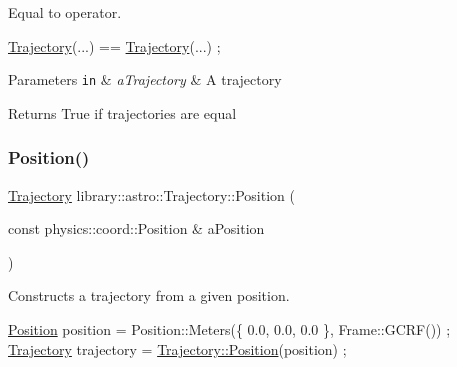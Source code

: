 Equal to operator. 


\begin{DoxyCode}
\hyperlink{classlibrary_1_1astro_1_1_trajectory_a8e5c7740915ca947e067c0f419ac1c65}{Trajectory}(...) == \hyperlink{classlibrary_1_1astro_1_1_trajectory_a8e5c7740915ca947e067c0f419ac1c65}{Trajectory}(...) ;
\end{DoxyCode}



\begin{DoxyParams}[1]{Parameters}
\mbox{\tt in}  & {\em a\+Trajectory} & A trajectory \\
\hline
\end{DoxyParams}
\begin{DoxyReturn}{Returns}
True if trajectories are equal 
\end{DoxyReturn}
\mbox{\label{classlibrary_1_1astro_1_1_trajectory_a39e9a50f84016cb53ca36d61809dc058}} 
\subsubsection{\texorpdfstring{Position()}{Position()}}
{\footnotesize\ttfamily \hyperlink{classlibrary_1_1astro_1_1_trajectory}{Trajectory} library\+::astro\+::\+Trajectory\+::\+Position (\begin{DoxyParamCaption}\item[{const physics\+::coord\+::\+Position \&}]{a\+Position }\end{DoxyParamCaption})\hspace{0.3cm}{\ttfamily [static]}}



Constructs a trajectory from a given position. 


\begin{DoxyCode}
\hyperlink{classlibrary_1_1astro_1_1_trajectory_a39e9a50f84016cb53ca36d61809dc058}{Position} position = Position::Meters(\{ 0.0, 0.0, 0.0 \}, Frame::GCRF()) ;
\hyperlink{classlibrary_1_1astro_1_1_trajectory_a8e5c7740915ca947e067c0f419ac1c65}{Trajectory} trajectory = \hyperlink{classlibrary_1_1astro_1_1_trajectory_a39e9a50f84016cb53ca36d61809dc058}{Trajectory::Position}(position) ;
\end{DoxyCode}



